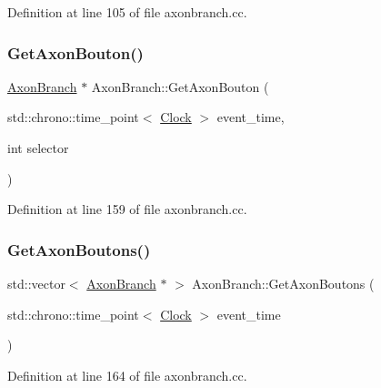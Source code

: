 Definition at line 105 of file axonbranch.\+cc.

\mbox{\label{class_axon_branch_a6fa6eea91e72fd142f3d691f7ca4c99a}} 
\subsubsection{\texorpdfstring{Get\+Axon\+Bouton()}{GetAxonBouton()}}
{\footnotesize\ttfamily \mbox{\hyperlink{class_axon_branch}{Axon\+Branch}} $\ast$ Axon\+Branch\+::\+Get\+Axon\+Bouton (\begin{DoxyParamCaption}\item[{std\+::chrono\+::time\+\_\+point$<$ \mbox{\hyperlink{universe_8h_a0ef8d951d1ca5ab3cfaf7ab4c7a6fd80}{Clock}} $>$}]{event\+\_\+time,  }\item[{int}]{selector }\end{DoxyParamCaption})}



Definition at line 159 of file axonbranch.\+cc.

\mbox{\label{class_axon_branch_aafadba57924686a8087c7f7758889045}} 
\subsubsection{\texorpdfstring{Get\+Axon\+Boutons()}{GetAxonBoutons()}}
{\footnotesize\ttfamily std\+::vector$<$ \mbox{\hyperlink{class_axon_branch}{Axon\+Branch}} $\ast$ $>$ Axon\+Branch\+::\+Get\+Axon\+Boutons (\begin{DoxyParamCaption}\item[{std\+::chrono\+::time\+\_\+point$<$ \mbox{\hyperlink{universe_8h_a0ef8d951d1ca5ab3cfaf7ab4c7a6fd80}{Clock}} $>$}]{event\+\_\+time }\end{DoxyParamCaption})}



Definition at line 164 of file axonbranch.\+cc.

\mbox{\label{class_axon_branch_a1d2404b68ec2d18a814c96a7c04c5fc4}} 
